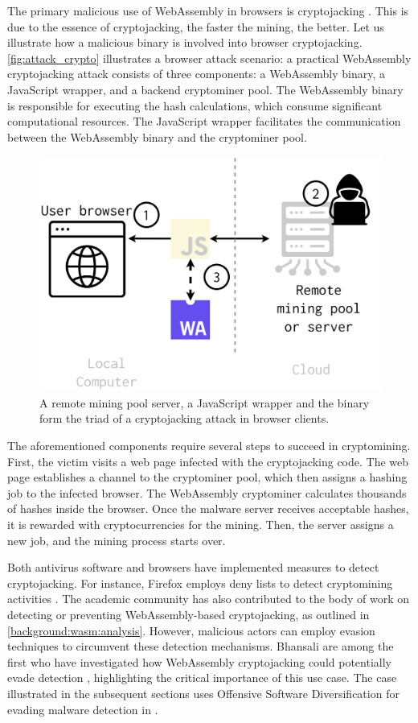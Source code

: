 \label{offensive_app}

The primary malicious use of WebAssembly in browsers is cryptojacking \cite{musch2019new}. 
This is due to the essence of cryptojacking, the faster the mining, the better. 
Let us illustrate how a malicious \Wasm binary is involved into browser cryptojacking.
\autoref{fig:attack_crypto} illustrates a browser attack scenario:
a practical WebAssembly cryptojacking attack consists of three components: a WebAssembly binary, a JavaScript wrapper, and a backend cryptominer pool. 
The WebAssembly binary is responsible for executing the hash calculations, which consume significant computational resources. 
The JavaScript wrapper facilitates the communication between the WebAssembly binary and the cryptominer pool.

\begin{figure}[h]
    \centering
    \includegraphics[width=0.6\linewidth]{figures/attack_crypto.pdf}
    \caption{A remote mining pool server, a JavaScript wrapper and the \Wasm binary form the triad of a cryptojacking attack in browser clients.}
    \label{fig:attack_crypto}
\end{figure}

The aforementioned components require several steps to succeed in cryptomining.
First, the victim visits a web page infected with the cryptojacking code. 
The web page establishes a channel to the cryptominer pool, which then assigns a hashing job to the infected browser. 
The WebAssembly cryptominer calculates thousands of hashes inside the browser. 
Once the malware server receives acceptable hashes, it is rewarded with cryptocurrencies for the mining. 
Then, the server assigns a new job, and the mining process starts over.

Both antivirus software and browsers have implemented measures to detect cryptojacking. For instance, Firefox employs deny lists to detect cryptomining activities \cite{firefoxcrypto}. 
The academic community has also contributed to the body of work on detecting or preventing WebAssembly-based cryptojacking, as outlined in \autoref{background:wasm:analysis}. 
However, malicious actors can employ evasion techniques to circumvent these detection mechanisms. 
Bhansali \etal are among the first who have investigated how WebAssembly cryptojacking could potentially evade detection \cite{10.1145/3507657.3528560}, highlighting the critical importance of this use case. 
The case illustrated in the subsequent sections uses Offensive Software Diversification for evading malware detection in \Wasm. 

